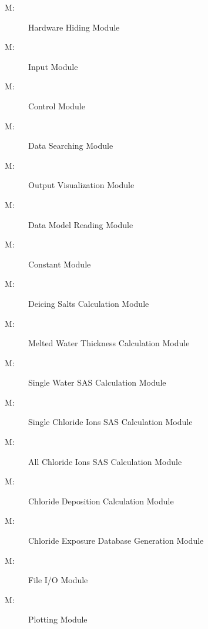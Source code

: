 \documentclass[12pt, titlepage]{article}
\newcounter{mnum}
\newcommand{\mthemnum}{M\themnum}
\begin{document}
\begin{description}
\item [ \mthemnum \label{mHardware}:] Hardware Hiding Module
\item [ \mthemnum \label{mInput}:] Input Module
\item [ \mthemnum \label{mControl}:] Control Module
\item [ \mthemnum \label{mSearch}:] Data Searching Module
\item [ \mthemnum \label{mOutput}:] Output Visualization Module
\item [ \mthemnum \label{mDataModel}:] Data Model Reading Module 
\item [ \mthemnum \label{mConstant}:] Constant Module 
\item [ \mthemnum \label{mCalculation_step1}:] Deicing Salts Calculation Module 
\item [ \mthemnum \label{mCalculation_step2}:] Melted Water Thickness Calculation Module 
\item [ \mthemnum \label{mCalculation_step3}:] Single Water SAS Calculation Module 
\item [ \mthemnum \label{mCalculation_step4}:] Single Chloride Ions SAS Calculation Module 
\item [ \mthemnum \label{mCalculation_step5}:] All Chloride Ions SAS Calculation Module 
\item [ \mthemnum \label{mCalculation_step6}:] Chloride Deposition Calculation Module 
\item [ \mthemnum \label{mCalculation_result}:] Chloride Exposure Database Generation Module
\item [ \mthemnum \label{mFileIO}:] File I/O Module
\item [ \mthemnum \label{mPlot}:] Plotting Module
\end{description}
\end{document}
